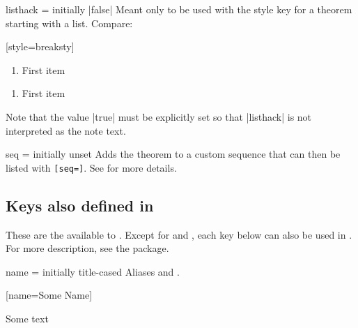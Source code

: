 \documentclass{ltxdoc}
\newcommand{\bracks}[1]{\texttt{[#1]}}
\begin{document}
\begin{docKey}{listhack}
  {=\textbar{}}
  {initially |false|}
Meant only to be used with the  style key for a theorem starting with a list.
Compare:

\begin{tcbwritetemp}
[style=breaksty]
\end{tcbwritetemp}

\begin{keythmscode}[withpreamble]
\begin{observation}
\begin{enumerate}
\item First item
\end{enumerate}
\end{observation}

\begin{observation}[listhack=true]
\begin{enumerate}
\item First item
\end{enumerate}
\end{observation}
\end{keythmscode}

Note that the value |true| must be explicitly set so that |listhack| is not interpreted as the note text.
\end{docKey}

\begin{docKey}[][doc label=thm/seq]{seq}
  {=}
  {initially unset}
Adds the theorem to a custom sequence  that can then be listed with \bracks{seq=}.
See  for more details.
\end{docKey}

\subsection{Keys also defined in } \label{thm-thmtools-keys}

These are the  available to .
Except for  and , each key below can also be used in .
For more description, see the \href{https://ctan.org/pkg/thmtools}{} package.

\begin{docKey}[][doc label=thm/name]{name}
  {=}
  {initially title-cased }
Aliases  and .

\begin{tcbwritetemp}
[name=Some Name]
\end{tcbwritetemp}

\begin{keythmscode}[withpreamble]
\begin{mythm}
Some text
\end{mythm}
\end{keythmscode}

\end{docKey}
\end{document}
